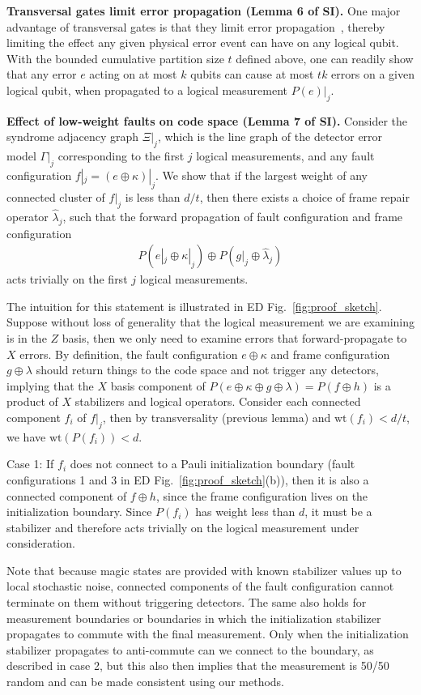 \textbf{Transversal gates limit error propagation (Lemma 6 of SI).}
%
One major advantage of transversal gates is that they limit error propagation~\cite{shor1996fault,gottesman2010introduction}, thereby limiting the effect any given physical error event can have on any logical qubit.
%
With the bounded cumulative partition size $t$ defined above, one can readily show that any error $e$ acting on at most $k$ qubits can cause at most $tk$ errors on a given logical qubit, when propagated to a logical measurement $P(e)|_j$.

\textbf{Effect of low-weight faults on code space (Lemma 7 of SI).}
%
Consider the syndrome adjacency graph $\Xi|_j$, which is the line graph of the detector error model $\Gamma|_j$ corresponding to the first $j$ logical measurements, and any fault configuration $f|_j=(e\oplus\kappa)|_j$.
%
We show that if the largest weight of any connected cluster of $f|_j$ is less than $d/t$, then there exists a choice of frame repair operator $\hat{\lambda}_j$, such that the forward propagation of fault configuration and frame configuration
\begin{align}
P(e|_j\oplus\kappa|_j)\oplus P(g|_j\oplus \hat{\lambda}_j)
\end{align}
acts trivially on the first $j$ logical measurements.

The intuition for this statement is illustrated in ED Fig.~\ref{fig:proof_sketch}.
%
Suppose without loss of generality that the logical measurement we are examining is in the $Z$ basis, then we only need to examine errors that forward-propagate to $X$ errors.
%
By definition, the fault configuration $e\oplus \kappa$ and frame configuration $g\oplus \lambda$ should return things to the code space and not trigger any detectors, implying that the $X$ basis component of \mbox{$P(e\oplus \kappa\oplus g\oplus\lambda)=P(f\oplus h)$} is a product of $X$ stabilizers and logical operators.
%
Consider each connected component $f_i$ of $f|_j$, then by transversality (previous lemma) and $\textrm{wt}(f_i)<d/t$, we have $\textrm{wt}(P(f_i))<d$.

Case 1: If $f_i$ does not connect to a Pauli initialization boundary (fault configurations 1 and 3 in ED Fig.~\ref{fig:proof_sketch}(b)), then it is also a connected component of $f\oplus h$, since the frame configuration lives on the initialization boundary.
%
Since $P(f_i)$ has weight less than $d$, it must be a stabilizer and therefore acts trivially on the logical measurement under consideration.

Note that because magic states are provided with known stabilizer values up to local stochastic noise, connected components of the fault configuration cannot terminate on them without triggering detectors.
%
The same also holds for measurement boundaries or boundaries in which the initialization stabilizer propagates to commute with the final measurement.
%
Only when the initialization stabilizer propagates to anti-commute can we connect to the boundary, as described in case 2, but this also then implies that the measurement is 50/50 random and can be made consistent using our methods.

